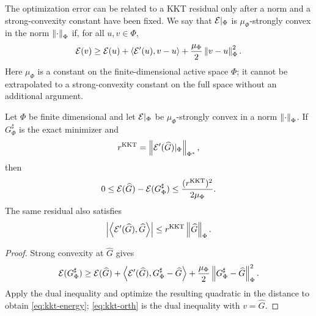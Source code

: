 The optimization error can be related to a KKT residual only after a norm and a strong-convexity
constant have been fixed. We say that $\mathcal{E}|_\Phi$ is $\mu_\Phi$-strongly convex in the norm
$\left\lVert \cdot\right\rVert_\Phi$ if, for all $u,v\in\Phi$,
\[
 \mathcal{E}(v)\geq \mathcal{E}(u)+\langle\mathcal{E}'(u),v-u\rangle
       +\frac{\mu_\Phi}{2}\left\lVert v-u\right\rVert_\Phi^2 .
\]
Here $\mu_\Phi$ is a constant on the finite-dimensional active space $\Phi$; it
cannot be extrapolated to a strong-convexity constant on the full space without an
additional argument.

\begin{lemma}
\label{lem:kkt}
Let \(\Phi\) be finite dimensional and let \(\mathcal{E}|_\Phi\) be \(\mu_\Phi\)-strongly convex in a norm
\(\left\lVert \cdot\right\rVert_\Phi\). If \(G_\Phi^{\sharp}\) is the exact minimizer and
\[
 r^{\mathrm{KKT}}=\left\lVert \mathcal{E}'(\widehat G)|_\Phi\right\rVert_{\Phi^*},
\]
then
\begin{equation}
 0\leq\mathcal{E}(\widehat G)-\mathcal{E}(G_\Phi^{\sharp})
 \leq\frac{(r^{\mathrm{KKT}})^2}{2\mu_\Phi}.
\label{eq:kkt-energy}
\end{equation}
The same residual also satisfies
\begin{equation}
 \left\lvert \left\langle \mathcal{E}'(\widehat G),\widehat G\right\rangle\right\rvert
 \leq r^{\mathrm{KKT}}\left\lVert \widehat G\right\rVert_\Phi.
\label{eq:kkt-orth}
\end{equation}
\end{lemma}

\begin{proof}
Strong convexity at \(\widehat G\) gives
\[
 \mathcal{E}(G_\Phi^{\sharp})\geq\mathcal{E}(\widehat G)+
 \left\langle \mathcal{E}'(\widehat G),G_\Phi^{\sharp}-\widehat G\right\rangle
 +\frac{\mu_\Phi}{2}\left\lVert G_\Phi^{\sharp}-\widehat G\right\rVert_\Phi^2.
\]
Apply the dual inequality and optimize the resulting quadratic in the distance to obtain
\cref{eq:kkt-energy}; \cref{eq:kkt-orth} is the dual inequality with
\(v=\widehat G\).
\end{proof}

